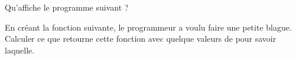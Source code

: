 
\begin{exercice}\label{exosmath-0528}

    Qu'affiche le programme suivant ?

    

    En créant la fonction suivante, le programmeur a voulu faire une petite blague. Calculer ce que retourne cette fonction avec quelque valeurs de  pour savoir laquelle.

    


\end{exercice}
